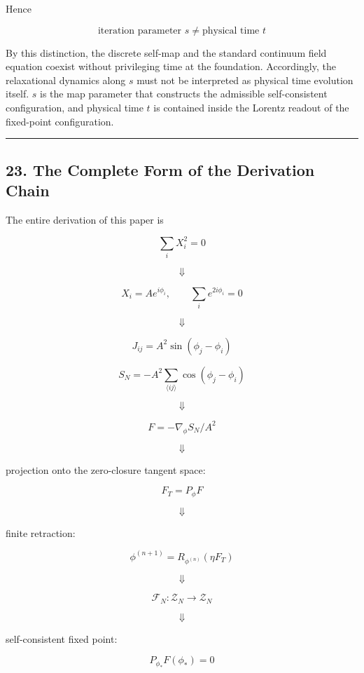 \documentclass[
  a4paper,
]{article}
\begin{document}
Hence

\[
\boxed{
\text{iteration parameter }s
\neq
\text{physical time }t
}
\tag{72}
\]

By this distinction, the discrete self-map and the standard continuum
field equation coexist without privileging time at the foundation.
Accordingly, the relaxational dynamics along \(s\) must not be
interpreted as physical time evolution itself. \(s\) is the map
parameter that constructs the admissible self-consistent configuration,
and physical time \(t\) is contained inside the Lorentz readout of the
fixed-point configuration.

\begin{center}\rule{0.5\linewidth}{0.5pt}\end{center}

\subsection{23. The Complete Form of the Derivation
Chain}\label{the-complete-form-of-the-derivation-chain}

The entire derivation of this paper is

\[
\boxed{
\sum_iX_i^2=0
}
\]

\[
\Downarrow
\]

\[
\boxed{
X_i=Ae^{i\phi_i},
\qquad
\sum_i e^{2i\phi_i}=0
}
\]

\[
\Downarrow
\]

\[
\boxed{
J_{ij}
=
A^2\sin(\phi_j-\phi_i)
}
\]

\[
\boxed{
S_N
=
-A^2
\sum_{\langle ij\rangle}
\cos(\phi_j-\phi_i)
}
\]

\[
\Downarrow
\]

\[
\boxed{
F
=
-\nabla_\phi S_N/A^2
}
\]

\[
\Downarrow
\]

projection onto the zero-closure tangent space:

\[
\boxed{
F_T=P_\phi F
}
\]

\[
\Downarrow
\]

finite retraction:

\[
\boxed{
\phi^{(n+1)}
=
R_{\phi^{(n)}}(\eta F_T)
}
\]

\[
\Downarrow
\]

\[
\boxed{
\mathcal F_N:
\mathcal Z_N
\to
\mathcal Z_N
}
\]

\[
\Downarrow
\]

self-consistent fixed point:

\[
\boxed{
P_{\phi_*}F(\phi_*)=0
}
\]
\end{document}
